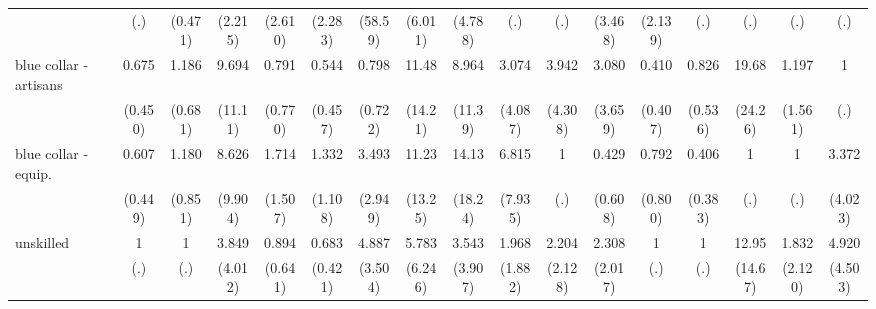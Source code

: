 {\begin{tabular}{l*{16}{c}}
                    &         (.)         &     (0.471)         &     (2.215)         &     (2.610)         &     (2.283)         &     (58.59)         &     (6.011)         &     (4.788)         &         (.)         &         (.)         &     (3.468)         &     (2.139)         &         (.)         &         (.)         &         (.)         &         (.)         \\
[1em]
blue collar - artisans&       0.675         &       1.186         &       9.694\sym{*}  &       0.791         &       0.544         &       0.798         &       11.48\sym{*}  &       8.964         &       3.074         &       3.942         &       3.080         &       0.410         &       0.826         &       19.68\sym{*}  &       1.197         &           1         \\
                    &     (0.450)         &     (0.681)         &     (11.11)         &     (0.770)         &     (0.457)         &     (0.722)         &     (14.21)         &     (11.39)         &     (4.087)         &     (4.308)         &     (3.659)         &     (0.407)         &     (0.536)         &     (24.26)         &     (1.561)         &         (.)         \\
[1em]
blue collar - equip.&       0.607         &       1.180         &       8.626         &       1.714         &       1.332         &       3.493         &       11.23\sym{*}  &       14.13\sym{*}  &       6.815         &           1         &       0.429         &       0.792         &       0.406         &           1         &           1         &       3.372         \\
                    &     (0.449)         &     (0.851)         &     (9.904)         &     (1.507)         &     (1.108)         &     (2.949)         &     (13.25)         &     (18.24)         &     (7.935)         &         (.)         &     (0.608)         &     (0.800)         &     (0.383)         &         (.)         &         (.)         &     (4.023)         \\
[1em]
unskilled           &           1         &           1         &       3.849         &       0.894         &       0.683         &       4.887\sym{*}  &       5.783         &       3.543         &       1.968         &       2.204         &       2.308         &           1         &           1         &       12.95\sym{*}  &       1.832         &       4.920         \\
                    &         (.)         &         (.)         &     (4.012)         &     (0.641)         &     (0.421)         &     (3.504)         &     (6.246)         &     (3.907)         &     (1.882)         &     (2.128)         &     (2.017)         &         (.)         &         (.)         &     (14.67)         &     (2.120)         &     (4.503)         \\

\end{tabular}}
